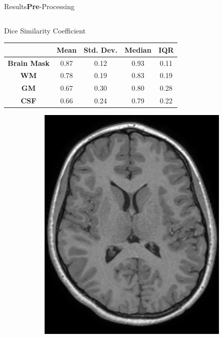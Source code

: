 \documentclass[]{standalone}
\begin{document}
\begin{frame}{Results}{\textbf{Pre}-Processing}
\begin{columns}
		\begin{column}{0.65\textwidth}
		\begin{block}{Dice Similarity Coefficient}
		\begin{table}[h!]
			\centering
			\small
			\setlength{\tabcolsep}{3pt}
			\begin{tabular}{c|cccc}
					    & \textbf{Mean} & \textbf{Std. Dev.} & \textbf{Median} & \textbf{IQR} \\ \hline
			\textbf{Brain Mask} & 0.87          & 0.12               & 0.93            & 0.11         \\
			\textbf{WM}         & 0.78          & 0.19               & 0.83            & 0.19         \\
			\textbf{GM}         & 0.67          & 0.30               & 0.80            & 0.28         \\
			\textbf{CSF}        & 0.66          & 0.24               & 0.79            & 0.22        
			\end{tabular}
			\end{table}
			\vspace{-10pt}
		\end{block}
			\vspace{-5pt}
			\begin{figure}[h!]
			\tiny
			\centering
				\begin{subfigure}{0.3\textwidth}
					\includegraphics[scale=0.11]{./IMG/T1W48.png}

\end{subfigure}
\end{figure}
\end{column}
\end{columns}
\end{frame}
\end{document}
